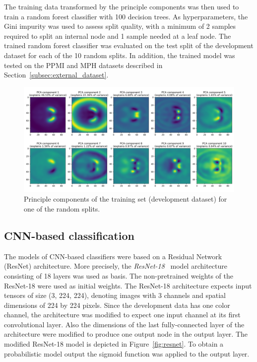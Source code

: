 The training data transformed by the principle components was then used to train a random forest classifier with 100 decision trees.
As hyperparameters, the Gini impurity was used to assess split quality, 
with a minimum of 2 samples required to split an internal node and 1 sample needed at a leaf node.
The trained random forest classifier was evaluated on the test split of the development dataset for each of the 10 random splits.
In addition, the trained model was tested on the PPMI and MPH datasets described in Section~\ref{subsec:external_dataset}.

\begin{figure}[ht]
  \centering
  \includegraphics[width=1.0\textwidth]{content/figures/pca_components_splittrain.png}
  \caption{Principle components of the training set (development dataset) for one of the random splits.} 
  \label{fig:pca_components}
\end{figure} 

\subsection{CNN-based classification}
\label{subsec:cnn_based_classification}

The models of CNN-based classifiers were based on a Residual Network \\(ResNet) architecture.
More precisely, the \textit{ResNet-18}~\citep{resnet2015} model architecture consisting of 18 layers was used as basis.
The non-pretrained weights of the ResNet-18 were used as initial weights.
The ResNet-18 architecture expects input tensors of size (3, 224, 224), 
denoting images with 3 channels and spatial dimensions of 224 by 224 pixels.
Since the development data has one color channel, the architecture was modified to expect one input channel at its 
first convolutional layer.
Also the dimensions of the last fully-connected layer of the architecture were modified to produce one output node 
in the output layer.
The modified ResNet-18 model is depicted in Figure~\ref{fig:resnet}.
To obtain a probabilistic model output the sigmoid function was applied to the output layer.

